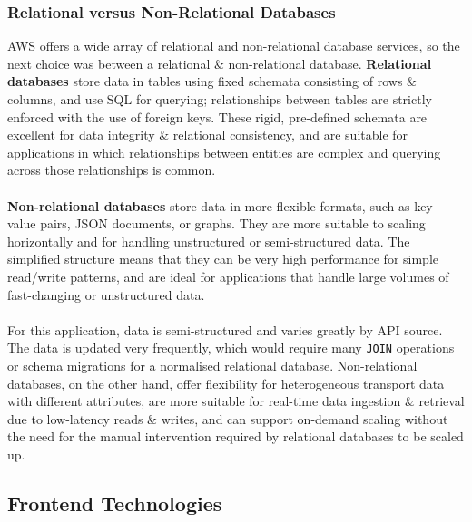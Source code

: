 \documentclass[a4paper,11pt]{report}
\begin{document}
\subsubsection{Relational versus Non-Relational Databases}
AWS offers a wide array of relational and non-relational database services, so the next choice was between a relational \& non-relational database.
\textbf{Relational databases} store data in tables using fixed schemata consisting of rows \& columns, and use SQL for querying;
relationships between tables are strictly enforced with the use of foreign keys.
These rigid, pre-defined schemata are excellent for data integrity \& relational consistency, and are suitable for applications in which relationships between entities are complex and querying across those relationships is common.
\\\\
\textbf{Non-relational databases} store data in more flexible formats, such as key-value pairs, JSON documents, or graphs.
They are more suitable to scaling horizontally and for handling unstructured or semi-structured data.
The simplified structure means that they can be very high performance for simple read/write patterns, and are ideal for applications that handle large volumes of fast-changing or unstructured data.
\\\\
For this application, data is semi-structured and varies greatly by API source.
The data is updated very frequently, which would require many \texttt{JOIN} operations or schema migrations for a normalised relational database.
Non-relational databases, on the other hand, offer flexibility for heterogeneous transport data with different attributes, are more suitable for real-time data ingestion \& retrieval due to low-latency reads \& writes, and can support on-demand scaling without the need for the manual intervention required by relational databases to be scaled up.


\subsection{Frontend Technologies}
\end{document}
